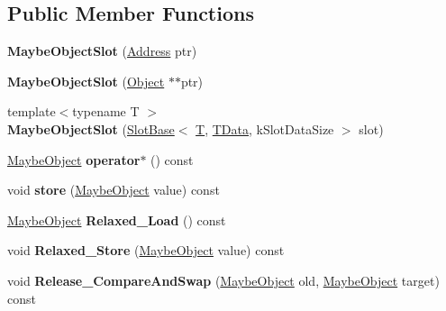\subsection*{Public Member Functions}
\begin{DoxyCompactItemize}
\item 
\mbox{\label{classv8_1_1internal_1_1MaybeObjectSlot_a3dc4270ef4f4611870960ad2c4d2653b}} 
{\bfseries Maybe\+Object\+Slot} (\mbox{\hyperlink{classuintptr__t}{Address}} ptr)
\item 
\mbox{\label{classv8_1_1internal_1_1MaybeObjectSlot_aa29a6cfe7d6f0317272c5cadb4324b97}} 
{\bfseries Maybe\+Object\+Slot} (\mbox{\hyperlink{classv8_1_1internal_1_1Object}{Object}} $\ast$$\ast$ptr)
\item 
\mbox{\label{classv8_1_1internal_1_1MaybeObjectSlot_a6ed6222e7ac32c2f1cc32fe2219db821}} 
{\footnotesize template$<$typename T $>$ }\\{\bfseries Maybe\+Object\+Slot} (\mbox{\hyperlink{classv8_1_1internal_1_1SlotBase}{Slot\+Base}}$<$ \mbox{\hyperlink{classv8_1_1internal_1_1torque_1_1T}{T}}, \mbox{\hyperlink{classuintptr__t}{T\+Data}}, k\+Slot\+Data\+Size $>$ slot)
\item 
\mbox{\label{classv8_1_1internal_1_1MaybeObjectSlot_a9cbf7e5c488862153012adf75b6f21d4}} 
\mbox{\hyperlink{classv8_1_1internal_1_1MaybeObject}{Maybe\+Object}} {\bfseries operator$\ast$} () const
\item 
\mbox{\label{classv8_1_1internal_1_1MaybeObjectSlot_abd8f1c01bc13956dff845c02913b9760}} 
void {\bfseries store} (\mbox{\hyperlink{classv8_1_1internal_1_1MaybeObject}{Maybe\+Object}} value) const
\item 
\mbox{\label{classv8_1_1internal_1_1MaybeObjectSlot_a5a1fca18945e1c0ac4385c099a2bc1dd}} 
\mbox{\hyperlink{classv8_1_1internal_1_1MaybeObject}{Maybe\+Object}} {\bfseries Relaxed\+\_\+\+Load} () const
\item 
\mbox{\label{classv8_1_1internal_1_1MaybeObjectSlot_a309e3756f71dfdad0e9f3fa66f2d7b5a}} 
void {\bfseries Relaxed\+\_\+\+Store} (\mbox{\hyperlink{classv8_1_1internal_1_1MaybeObject}{Maybe\+Object}} value) const
\item 
\mbox{\label{classv8_1_1internal_1_1MaybeObjectSlot_ac47676b14a2f6eb9afb3699696360bcf}} 
void {\bfseries Release\+\_\+\+Compare\+And\+Swap} (\mbox{\hyperlink{classv8_1_1internal_1_1MaybeObject}{Maybe\+Object}} old, \mbox{\hyperlink{classv8_1_1internal_1_1MaybeObject}{Maybe\+Object}} target) const
\end{DoxyCompactItemize}
